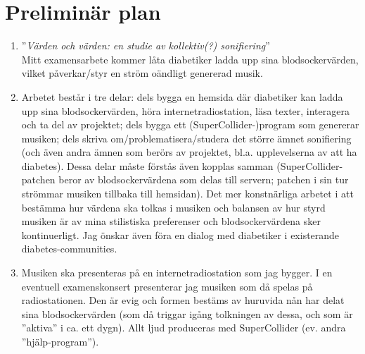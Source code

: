 \documentclass[12pt]{article}
\begin{document}
\newpage
\section*{Preliminär plan}
\begin{enumerate}
		\item ''\emph{Värden och värden: en studie av kollektiv(?) sonifiering}''
		\\Mitt examensarbete kommer låta diabetiker ladda upp sina blodsockervärden, vilket påverkar/styr en ström oändligt genererad musik.
\item Arbetet består i tre delar: dels bygga en hemsida där diabetiker kan ladda upp sina blodsockervärden, höra internetradiostation, läsa texter, interagera och ta del av projektet; dels bygga ett (SuperCollider-)program som genererar musiken; dels skriva om/problematisera/studera det större ämnet sonifiering (och även andra ämnen som berörs av projektet, bl.a.  upplevelserna av att ha diabetes). Dessa delar måste förstås även kopplas samman (SuperCollider-patchen beror av blodsockervärdena som delas till servern; patchen i sin tur strömmar musiken tillbaka till hemsidan). Det mer konstnärliga arbetet i att bestämma hur värdena ska tolkas i musiken och balansen av hur styrd musiken är av mina stilistiska preferenser och blodsockervärdena sker kontinuerligt. Jag önskar även föra en dialog med diabetiker i existerande diabetes-communities.
		\item Musiken ska presenteras på en internetradiostation som jag bygger. I en eventuell examenskonsert presenterar jag musiken som då spelas på radiostationen. Den är evig och formen bestäms av huruvida nån har delat sina blodsockervärden (som då triggar igång tolkningen av dessa, och som är ''aktiva'' i ca. ett dygn). Allt ljud produceras med SuperCollider (ev. andra ''hjälp-program'').
\end{enumerate}
\end{document}
